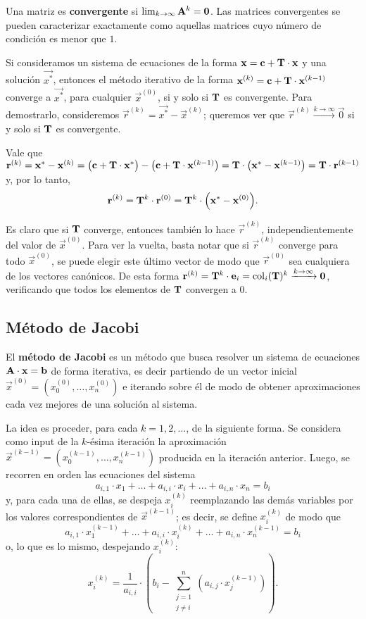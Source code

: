 Una matriz es \textbf{convergente} si $\lim_{k \to \infty} \mathbf{A}^k
= \mathbf{0}$. Las matrices convergentes se pueden caracterizar exactamente como
aquellas matrices cuyo número de condición es menor que $1$.

Si consideramos un sistema de ecuaciones de la forma $\mathbf{x} = \mathbf{c} +
\mathbf{T} \cdot \mathbf{x}$ y una solución $\vec{x^\ast}$, entonces el método
iterativo de la forma $\mathbf{x}^{(k)} = \mathbf{c} + \mathbf{T} \cdot
\mathbf{x}^{(k-1)}$ converge a $\vec{x^\ast}$, para cualquier $\vec{x}^{(0)}$,
si y solo si $\mathbf{T}$ es convergente.
Para demostrarlo, consideremos $\vec{r}^{(k)} = \vec{x^\ast} - \vec{x}^{(k)}$;
queremos ver que $\vec{r}^{(k)} \xrightarrow{k\to\infty} \vec{0}$ si y solo
si $\mathbf{T}$ es convergente.

Vale que
$\mathbf{r}^{(k)}
    = \mathbf{x^\ast} - \mathbf{x}^{(k)}
    = \big( \mathbf{c} + \mathbf{T} \cdot \mathbf{x^\ast} \big)
        - \big( \mathbf{c} + \mathbf{T} \cdot \mathbf{x}^{(k-1)} \big)
    = \mathbf{T} \cdot \big( \mathbf{x^\ast} - \mathbf{x}^{(k-1)} \big)
    = \mathbf{T} \cdot \mathbf{r}^{(k-1)} $
y, por lo tanto,
\[ \mathbf{r}^{(k)} = \mathbf{T}^k \cdot \mathbf{r}^{(0)}
    = \mathbf{T}^k \cdot \Big( \mathbf{x^\ast} - \mathbf{x}^{(0)} \Big). \]

Es claro que si $\mathbf{T}$ converge, entonces también lo hace $\vec{r}^{(k)}$,
independientemente del valor de $\vec{x}^{(0)}$.
Para ver la vuelta, basta notar que si $\vec{r}^{(k)}$ converge para todo 
$\vec{x}^{(0)}$, se puede elegir este último vector de modo que
$\vec{r}^{(0)}$ sea cualquiera de los vectores canónicos. De esta forma
$\mathbf{r}^{(k)} = \mathbf{T}^k \cdot \mathbf{e}_i = \operatorname{col}_i(\mathbf{T})^k
\xrightarrow{k\to\infty} \mathbf{0}$, verificando que todos los elementos de
$\mathbf{T}$ convergen a 0.

\subsection{Método de Jacobi}
El \textbf{método de Jacobi} es un método que busca resolver un sistema de
ecuaciones $\mathbf{A} \cdot \mathbf{x} = \mathbf{b}$ de forma iterativa, es decir
partiendo de un vector inicial $\vec{x}^{(0)} = (x^{(0)}_0, \dots, x^{(0)}_n)$
e iterando sobre él de modo de obtener aproximaciones cada vez mejores de una
solución al sistema.

La idea es proceder, para cada $k = 1, 2, \dots$, de la siguiente forma.
Se considera como input de la $k$-ésima iteración la aproximación
$\vec{x}^{(k-1)} = (x^{(k-1)}_0, \dots, x^{(k-1)}_n)$ producida en la
iteración anterior. Luego, se recorren en orden las ecuaciones del sistema
\[ a_{i,1} \cdot x_1 + \dots + a_{i,i} \cdot x_i + \dots
    + a_{i,n} \cdot x_n = b_i \]
y, para cada una de ellas, se despeja $x^{(k)}_i$ reemplazando las demás
variables por los valores correspondientes de $\vec{x}^{(k-1)}$; es decir,
se define $x^{(k)}_i$ de modo que
\[ a_{i,1} \cdot x^{(k-1)}_1 + \dots + a_{i,i} \cdot x^{(k)}_i + \dots
    + a_{i,n} \cdot x^{(k-1)}_n = b_i \]
o, lo que es lo mismo, despejando $x^{(k)}_i$:
\[ x^{(k)}_i = \frac{1}{a_{i,i}} \cdot \left( b_i -
    \sum_{\substack{j=1 \\ j \neq i}}^{n} \left( a_{i,j}
    \cdot x^{(k-1)}_j \right) \right). \]

